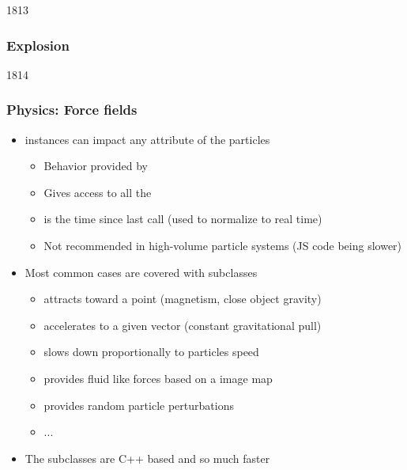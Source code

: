 \begin{slide}{1813}\frametitle{Explosion}


\vspace*{-20em}\hfill{}
\end{slide}


\begin{slide}{1814}\frametitle{Physics: Force fields}

\begin{itemize}
\item {} instances can impact any attribute of the particles
  \begin{itemize}
  \item Behavior provided by 
  \item Gives access to all the 
  \item {} is the time since last call (used to normalize to real time)
  \item Not recommended in high-volume particle systems (JS code being slower)
  \end{itemize}
\vspace*{0.5em}
\item Most common cases are covered with  subclasses
  \begin{itemize}
  \item {} attracts toward a point (magnetism, close object gravity)
  \item {} accelerates to a given vector (constant gravitational pull)
  \item {} slows down proportionally to particles speed
  \item {} provides fluid like forces based on a  image map
  \item {} provides random particle perturbations
  \item ...
  \end{itemize}
\vspace*{0.5em}
\item The subclasses are C++ based and so much faster
\end{itemize}

\end{slide}

